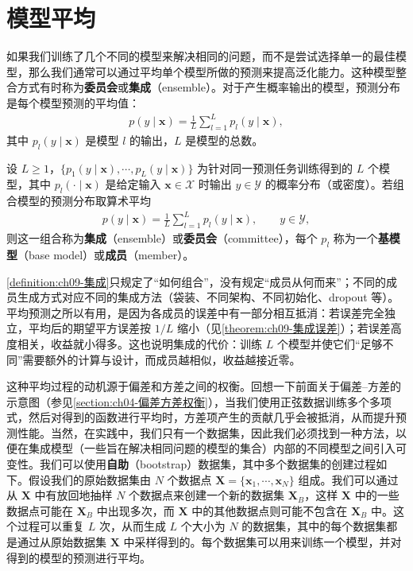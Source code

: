 \documentclass[../../main.tex]{subfiles}
\begin{document}
\section{模型平均}\label{section:ch09-模型平均}

如果我们训练了几个不同的模型来解决相同的问题，而不是尝试选择单一的最佳模型，那么我们通常可以通过平均单个模型所做的预测来提高泛化能力。这种模型整合方式有时称为\textbf{委员会}或\textbf{集成}（ensemble）。对于产生概率输出的模型，预测分布是每个模型预测的平均值：
\begin{align}
p(y\mid\boldsymbol{x})=\frac{1}{L}\sum_{l=1}^{L}p_{l}(y\mid\boldsymbol{x}),
\label{align:ch09-集成预测}
\end{align}
其中 $p_{l}(y\mid\boldsymbol{x})$ 是模型 $l$ 的输出，$L$ 是模型的总数。

\begin{definition}[集成与委员会]\label{definition:ch09-集成}
设 $L\geqslant1$，$\{p_{1}(y\mid\boldsymbol{x}),\cdots,p_{L}(y\mid\boldsymbol{x})\}$ 为针对同一预测任务训练得到的 $L$ 个模型，其中 $p_{l}(\cdot\mid\boldsymbol{x})$ 是给定输入 $\boldsymbol{x}\in\mathcal{X}$ 时输出 $y\in\mathcal{Y}$ 的概率分布（或密度）。若组合模型的预测分布取算术平均
\begin{align*}
p(y\mid\boldsymbol{x})=\frac{1}{L}\sum_{l=1}^{L}p_{l}(y\mid\boldsymbol{x}),\qquad y\in\mathcal{Y},
\end{align*}
则这一组合称为\textbf{集成}（ensemble）或\textbf{委员会}（committee），每个 $p_{l}$ 称为一个\textbf{基模型}（base model）或\textbf{成员}（member）。
\end{definition}

\begin{remark}\cref{definition:ch09-集成}只规定了“如何组合”，没有规定“成员从何而来”；不同的成员生成方式对应不同的集成方法（袋装、不同架构、不同初始化、dropout 等）。平均预测之所以有用，是因为各成员的误差中有一部分相互抵消：若误差完全独立，平均后的期望平方误差按 $1/L$ 缩小（见\cref{theorem:ch09-集成误差}）；若误差高度相关，收益就小得多。这也说明集成的代价：训练 $L$ 个模型并使它们“足够不同”需要额外的计算与设计，而成员越相似，收益越接近零。
\end{remark}

这种平均过程的动机源于偏差和方差之间的权衡。回想一下前面关于偏差--方差的示意图（参见\cref{section:ch04-偏差方差权衡}），当我们使用正弦数据训练多个多项式，然后对得到的函数进行平均时，方差项产生的贡献几乎会被抵消，从而提升预测性能。当然，在实践中，我们只有一个数据集，因此我们必须找到一种方法，以便在集成模型（一些旨在解决相同问题的模型的集合）内部的不同模型之间引入可变性。我们可以使用\textbf{自助}（bootstrap）数据集，其中多个数据集的创建过程如下。假设我们的原始数据集由 $N$ 个数据点 $\boldsymbol{X}=\{\boldsymbol{x}_{1},\cdots,\boldsymbol{x}_{N}\}$ 组成。我们可以通过从 $\boldsymbol{X}$ 中有放回地抽样 $N$ 个数据点来创建一个新的数据集 $\boldsymbol{X}_{B}$，这样 $\boldsymbol{X}$ 中的一些数据点可能在 $\boldsymbol{X}_{B}$ 中出现多次，而 $\boldsymbol{X}$ 中的其他数据点则可能不包含在 $\boldsymbol{X}_{B}$ 中。这个过程可以重复 $L$ 次，从而生成 $L$ 个大小为 $N$ 的数据集，其中的每个数据集都是通过从原始数据集 $\boldsymbol{X}$ 中采样得到的。每个数据集可以用来训练一个模型，并对得到的模型的预测进行平均。
\end{document}

